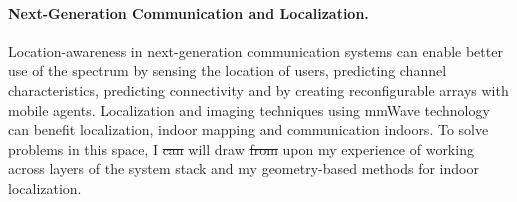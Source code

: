 \documentclass[10pt]{article}
\begin{document}
\paragraph{Next-Generation Communication and Localization. }
Location-awareness in next-generation communication systems can enable better use of the
spectrum by sensing the location of users, predicting channel characteristics, predicting connectivity and by creating reconfigurable arrays with mobile agents. 
Localization and imaging techniques using mmWave technology can benefit localization, indoor mapping and communication indoors.  %
To solve problems in this space, I \st{can} will draw \st{from} upon
my experience of working across layers of the system stack and my
geometry-based methods for indoor localization. \\
\end{document}
